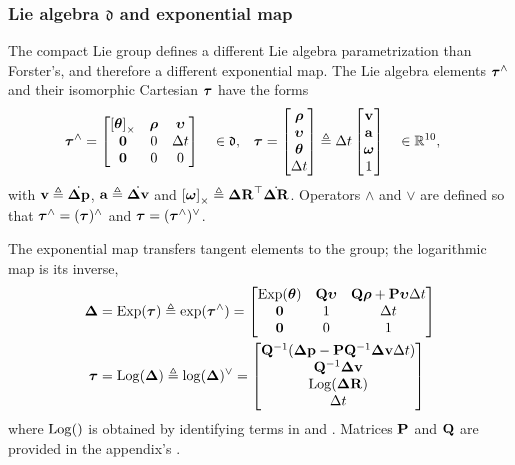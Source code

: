 \subsubsection{Lie algebra \texorpdfstring{$\mathfrak{d}$}{d} and exponential map}

The compact Lie group defines a different Lie algebra parametrization than Forster's, and therefore a different exponential map.
The Lie algebra elements ${\bm \tau}^\wedge$ and their isomorphic Cartesian ${\bm \tau}$ have the forms
%
\begin{align}
    \label{eq:lie_algebra}
    {\bm \tau}^\wedge &= \begin{bmatrix}
    \left[{{\bm \theta}}\right]_\times & {\bm \rho} & {\bm \upsilon} \\
    \bf0 & 0 & \Delta t \\
    \bf0 & 0 & 0
    \end{bmatrix} ~~~\in \mathfrak{d}
    ,&
    {\bm \tau} &= \begin{bmatrix}
    {\bm \rho} \\ {\bm \upsilon} \\ {{\bm \theta}} \\ \Delta t
    \end{bmatrix}
    \triangleq \Delta t \begin{bmatrix}
    {\bf v} \\ {\bf a} \\ {{\bm \omega}} \\ 1
    \end{bmatrix} 
    ~~~\in {\mathbb R}^{10}
    ,
\end{align}
%
with ${\bf v}\triangleq\dot{{\bm \Delta {\bf p}}}$, ${\bf a}\triangleq\dot{{\bm \Delta {\bf v}}}$ and $\left[{{\bm \omega}}\right]_\times\triangleq{\bm \Delta {\bf R}}^{\top}\dot{{\bm \Delta {\bf R}}}$.
Operators $\wedge$ and $\vee$ are defined so that ${\bm \tau}^\wedge=({\bm \tau})^\wedge$ and ${\bm \tau}=({\bm \tau}^\wedge)^\vee$.

The exponential map transfers tangent elements to the group; the logarithmic map is its inverse,
%
\begin{align}
    \D &= \Exp(\bftau) \te \exp(\bftau\hhat) = \begin{bmatrix}
    \Exp(\bth) & \bfQ\bfupsilon & \bfQ\bfrho+\bfP\bfupsilon\Dt \\
    \bf0 & 1 & \Dt \\
    \bf0 & 0 & 1
    \end{bmatrix} %
    \label{eq:compact_exp}
    \\
    \bftau &= \Log(\D) \te \log(\D)\vvee = \begin{bmatrix}
    \bfQ\inv(\Dp-\bfP\bfQ\inv\Dv\Dt) \\
    \bfQ\inv\Dv \\
    \Log(\DR) \\
    \Dt 
    \end{bmatrix} %
    \label{eq:compact_log}
\end{align}
%
where $\operatorname*{Log}()$ is obtained by identifying terms in  and .
Matrices ${\bf P}$ and ${\bf Q}$ are provided in the appendix's .


